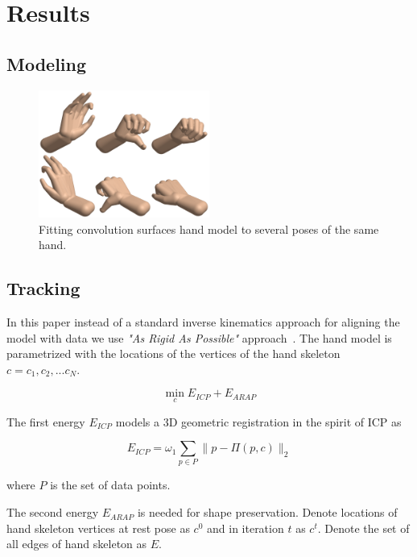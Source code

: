 \section{Results}

\subsection{Modeling}

\begin{figure}[h!] 
	\centering
	\includegraphics[width=0.5\textwidth]{fig/modeling}
	\caption{Fitting convolution surfaces hand model to several poses of the same hand.}
	\label{fig:modeling}
\end{figure}

\subsection{Tracking}

In this paper instead of a standard inverse kinematics approach for aligning the model with data we use \textit{"As Rigid As Possible"} approach~\cite{sorkine2007arap}. The hand model is parametrized with the locations of the vertices of the hand skeleton $c = {c_1, c_2, ... c_N}$.

\begin{equation}
	\min_{c} E_{ICP} + E_{ARAP} \label{eq:tracking_energy}
\end{equation}

The first energy $E_{ICP}$ models a 3D geometric registration in the spirit of ICP as

\begin{equation}
	E_{ICP} = \omega_1 \sum_{p \in P} \| p - \Pi(p, c)\|_2
\end{equation}

where $P$ is the set of data points.

The second energy $E_{ARAP}$ is needed for shape preservation. Denote locations of hand skeleton vertices at rest pose as $c^0$ and in iteration $t$ as $c^t$. Denote the set of all edges of hand skeleton as $E$.

